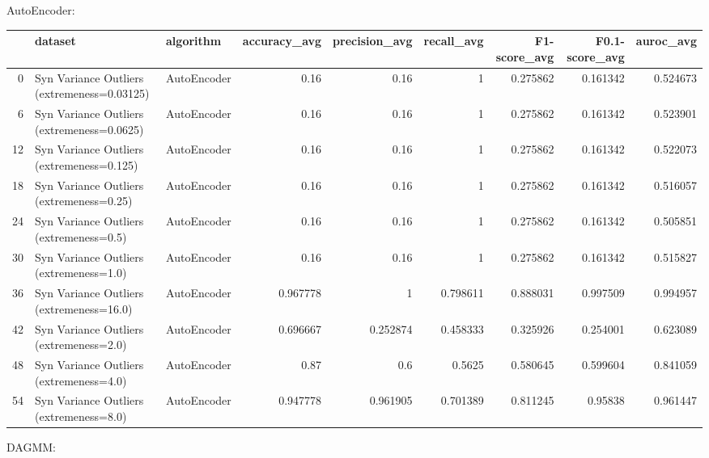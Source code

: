 AutoEncoder:

\begin{tabular}{rllrrrrrr}
\hline
    & dataset                                     & algorithm   &   accuracy\_avg &   precision\_avg &   recall\_avg &   F1-score\_avg &   F0.1-score\_avg &   auroc\_avg \\
\hline
  0 & Syn Variance Outliers (extremeness=0.03125) & AutoEncoder &       0.16     &        0.16     &     1        &       0.275862 &         0.161342 &    0.524673 \\
  6 & Syn Variance Outliers (extremeness=0.0625)  & AutoEncoder &       0.16     &        0.16     &     1        &       0.275862 &         0.161342 &    0.523901 \\
 12 & Syn Variance Outliers (extremeness=0.125)   & AutoEncoder &       0.16     &        0.16     &     1        &       0.275862 &         0.161342 &    0.522073 \\
 18 & Syn Variance Outliers (extremeness=0.25)    & AutoEncoder &       0.16     &        0.16     &     1        &       0.275862 &         0.161342 &    0.516057 \\
 24 & Syn Variance Outliers (extremeness=0.5)     & AutoEncoder &       0.16     &        0.16     &     1        &       0.275862 &         0.161342 &    0.505851 \\
 30 & Syn Variance Outliers (extremeness=1.0)     & AutoEncoder &       0.16     &        0.16     &     1        &       0.275862 &         0.161342 &    0.515827 \\
 36 & Syn Variance Outliers (extremeness=16.0)    & AutoEncoder &       0.967778 &        1        &     0.798611 &       0.888031 &         0.997509 &    0.994957 \\
 42 & Syn Variance Outliers (extremeness=2.0)     & AutoEncoder &       0.696667 &        0.252874 &     0.458333 &       0.325926 &         0.254001 &    0.623089 \\
 48 & Syn Variance Outliers (extremeness=4.0)     & AutoEncoder &       0.87     &        0.6      &     0.5625   &       0.580645 &         0.599604 &    0.841059 \\
 54 & Syn Variance Outliers (extremeness=8.0)     & AutoEncoder &       0.947778 &        0.961905 &     0.701389 &       0.811245 &         0.95838  &    0.961447 \\
\hline
\end{tabular}

DAGMM:

